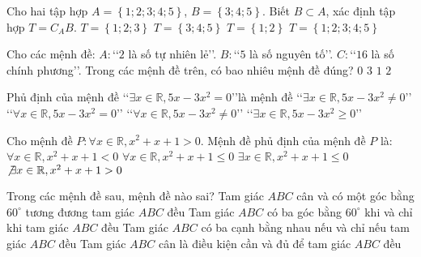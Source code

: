 \begin{ex}
	Cho hai tập hợp $A=\left\{ 1;2;3;4;5 \right\}$, $B=\left\{ 3;4;5 \right\}$.
	Biết $B\subset A$, xác định tập hợp $T=C_AB$.
	\choice
	{$T=\left\{ 1;2;3 \right\}$}
	{$T=\left\{ 3;4;5 \right\}$}
	{\True $T=\left\{ 1;2 \right\}$}
	{$T=\left\{ 1;2;3;4;5 \right\}$}
\end{ex}
\begin{ex}
	Cho các mệnh đề:
	$A\colon $\lq\lq $2$ là số tự nhiên lẻ\rq\rq.
	$B\colon $\lq\lq $5$ là số nguyên tố\rq\rq.
	$C\colon $\lq\lq $16$ là số chính phương\rq\rq.
	Trong các mệnh đề trên, có bao nhiêu mệnh đề đúng?
	\choice
	{$0$}
	{$3$}
	{$1$}
	{\True $2$}
\end{ex}
\begin{ex}
	Phủ định của mệnh đề \lq\lq $\exists x\in \mathbb{R},5x-3x^2=0$\rq\rq là mệnh đề
	\choice
	{\lq\lq $\exists x\in \mathbb{R},5x-3x^2\ne 0$\rq\rq}
    {\lq\lq $\forall x\in \mathbb{R},5x-3x^2=0$\rq\rq}
	{\True \lq\lq $\forall x\in \mathbb{R},5x-3x^2\ne 0$\rq\rq}
	{\lq\lq $\exists x\in \mathbb{R},5x-3x^2\ge 0$\rq\rq}
\end{ex}
\begin{ex}
	Cho mệnh đề $P\colon \forall x\in \mathbb{R},x^2+x+1>0$. Mệnh đề phủ định của mệnh đề $P$ là:
	\choice
	{$\forall x\in \mathbb{R},x^2+x+1<0$}
	{$\forall x\in \mathbb{R},x^2+x+1\le 0$}
	{\True $\exists x\in \mathbb{R},x^2+x+1\le 0$}
	{$\not\exists x\in \mathbb{R},x^2+x+1>0$}
\end{ex}
\begin{ex}
	Trong các mệnh đề sau, mệnh đề nào sai?
	\choice
	{Tam giác $ABC$ cân và có một góc bằng $60^\circ $ tương đương tam giác $ABC$ đều}
	{Tam giác $ABC$ có ba góc bằng $60^\circ $ khi và chỉ khi tam giác $ABC$ đều}
	{Tam giác $ABC$ có ba cạnh bằng nhau nếu và chỉ nếu tam giác $ABC$ đều}
	{\True Tam giác $ABC$ cân là điều kiện cần và đủ để tam giác $ABC$ đều}
\end{ex}
